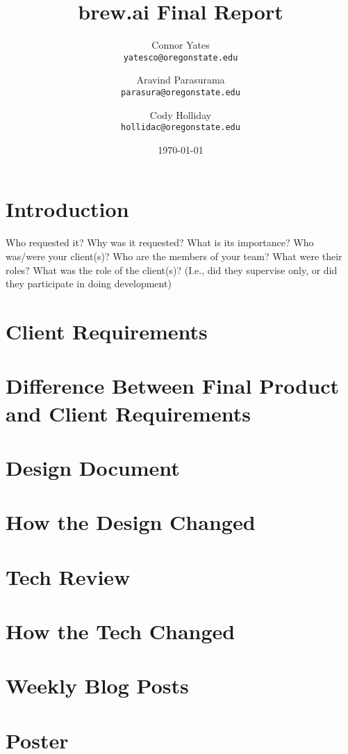 \documentclass[draftclsnofoot,onecolumn,letterpaper,10pt]{IEEEtran}
\author{Connor Yates\\
\texttt{yatesco@oregonstate.edu\\}
\and
Aravind Parasurama\\
\texttt{parasura@oregonstate.edu\\}
\and
Cody Holliday\\
\texttt{hollidac@oregonstate.edu\\}}
\date{\today}
\title{brew.ai Final Report}
\begin{document}
\maketitle

\newpage
\tableofcontents
\newpage

\section{Introduction}



Who requested it?
Why was it requested?
What is its importance?
Who was/were your client(s)?
Who are the members of your team?
What were their roles?
What was the role of the client(s)? (I.e., did they supervise only, or did they participate in doing development)



\section{Client Requirements}

\section{Difference Between Final Product and Client Requirements}

\section{Design Document}


\section{How the Design Changed}

\section{Tech Review}


\section{How the Tech Changed}
\section{Weekly Blog Posts}
\section{Poster}
\end{document}
